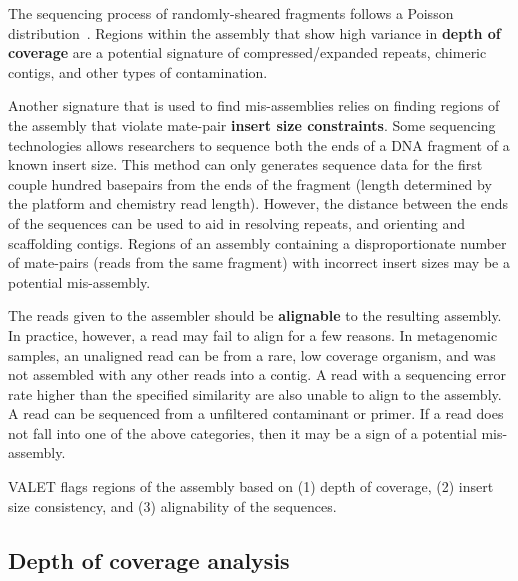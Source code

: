 \documentclass{bioinfo}
\begin{document}
The sequencing process of randomly-sheared fragments follows a Poisson distribution~\citep{lander1988genomic}.
Regions within the assembly that show high variance in \textbf{depth of coverage} are a potential signature of compressed/expanded repeats, chimeric contigs, and other types of contamination.

Another signature that is used to find mis-assemblies relies on finding regions of the assembly that violate mate-pair \textbf{insert size constraints}.
Some sequencing technologies allows researchers to sequence both the ends of a DNA fragment of a known insert size.
This method can only generates sequence data for the first couple hundred basepairs from the ends of the fragment (length determined by the platform and chemistry read length). 
However, the distance between the ends of the sequences can be used to aid in resolving repeats, and orienting and scaffolding contigs.
Regions of an assembly containing a disproportionate number of mate-pairs (reads from the same fragment) with incorrect insert sizes may be a potential mis-assembly.

The reads given to the assembler should be \textbf{alignable} to the resulting assembly.
In practice, however, a read may fail to align for a few reasons.
In metagenomic samples, an unaligned read can be from a rare, low coverage organism, and was not assembled with any other reads into a contig.
A read with a sequencing error rate higher than the specified similarity are also unable to align to the assembly.
A read can be sequenced from a unfiltered contaminant or primer.
If a read does not fall into one of the above categories, then it may be a sign of a potential mis-assembly.


VALET flags regions of the assembly based on (1) depth of coverage, (2) insert size consistency, and (3) alignability of the sequences.

\subsection{Depth of coverage analysis}
\end{document}
